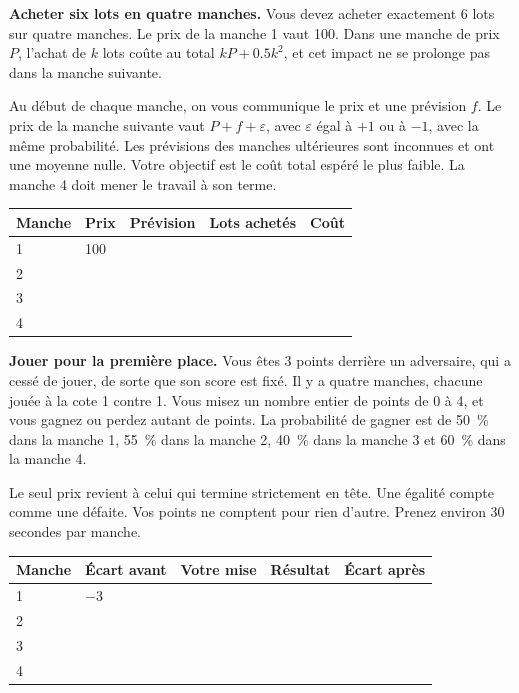 \begin{question}\label{iq:iv2:played-games:11}
\textbf{Acheter six lots en quatre manches.} Vous devez acheter exactement 6 lots sur quatre manches. Le prix de la manche 1 vaut 100. Dans une manche de prix $P$, l'achat de $k$ lots coûte au total $kP + 0.5k^2$, et cet impact ne se prolonge pas dans la manche suivante.

Au début de chaque manche, on vous communique le prix et une prévision $f$. Le prix de la manche suivante vaut $P + f + \varepsilon$, avec $\varepsilon$ égal à $+1$ ou à $-1$, avec la même probabilité. Les prévisions des manches ultérieures sont inconnues et ont une moyenne nulle. Votre objectif est le coût total espéré le plus faible. La manche 4 doit mener le travail à son terme.

\medskip
\begin{tabular}{@{}l|l|l|l|l@{}}
Manche & Prix & Prévision & Lots achetés & Coût \\ \hline
1 & 100 & & & \\[8pt]\hline
2 & & & & \\[8pt]\hline
3 & & & & \\[8pt]\hline
4 & & & & \\[8pt]\hline
\end{tabular}
\end{question}
\vfill\clearpage

\begin{question}\label{iq:iv2:played-games:12}
\textbf{Jouer pour la première place.} Vous êtes 3 points derrière un adversaire, qui a cessé de jouer, de sorte que son score est fixé. Il y a quatre manches, chacune jouée à la cote 1 contre 1. Vous misez un nombre entier de points de 0 à 4, et vous gagnez ou perdez autant de points. La probabilité de gagner est de 50~\% dans la manche 1, 55~\% dans la manche 2, 40~\% dans la manche 3 et 60~\% dans la manche 4.

Le seul prix revient à celui qui termine strictement en tête. Une égalité compte comme une défaite. Vos points ne comptent pour rien d'autre. Prenez environ 30 secondes par manche.

\medskip
\begin{tabular}{@{}l|l|l|l|l@{}}
Manche & Écart avant & Votre mise & Résultat & Écart après \\ \hline
1 & $-3$ & & & \\[8pt]\hline
2 & & & & \\[8pt]\hline
3 & & & & \\[8pt]\hline
4 & & & & \\[8pt]\hline
\end{tabular}
\end{question}
